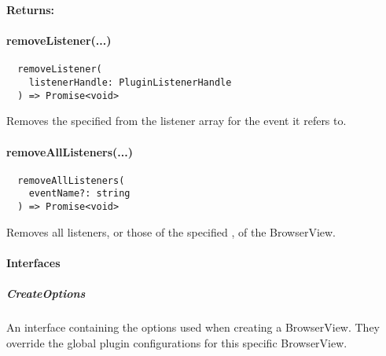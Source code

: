 \textbf{Returns:} 



\paragraph{removeListener(...)}

\begin{verbatim}
  removeListener(
    listenerHandle: PluginListenerHandle
  ) => Promise<void>
\end{verbatim}

Removes the specified  from the listener array for the event it refers to.



\paragraph{removeAllListeners(...)}

\begin{verbatim}
  removeAllListeners(
    eventName?: string
  ) => Promise<void>
\end{verbatim}

Removes all listeners, or those of the specified , of the BrowserView.


\newpage

\paragraph{Interfaces}


\subparagraph{CreateOptions}

An interface containing the options used when creating a BrowserView.
They override the global plugin configurations for this specific BrowserView.

